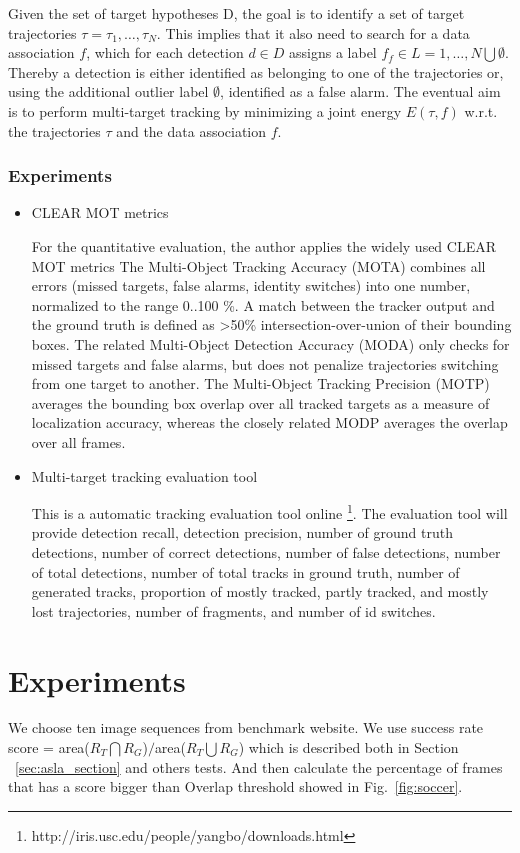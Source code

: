\documentclass{acm_proc_article-sp}
\begin{document}
Given the set of target hypotheses D, the goal is to identify a set of target trajectories $\tau = {\tau_1,\ldots,\tau_N}$. This implies that it also need to search for a data association $f$, which for each detection $d \in D$ assigns a label $f_f \in L = {1,\ldots,N}\bigcup \emptyset$. Thereby a detection is either identified as belonging to one of the trajectories or, using the additional outlier label $\emptyset$, identified as a false alarm.
The eventual aim is to perform multi-target tracking by minimizing a joint energy $E(\tau , f)$ w.r.t. the trajectories $\tau$ and the data association $f$. 

\subsubsection{Experiments}

\begin{itemize}
\item CLEAR MOT metrics

For the quantitative evaluation, the author applies the widely used CLEAR MOT metrics The Multi-Object Tracking Accuracy (MOTA) combines all errors (missed targets, false alarms, identity switches) into one number, normalized to the range 0..100 \%. A match between the tracker output and the ground truth is defined as >50\% intersection-over-union of their bounding boxes. The related Multi-Object Detection Accuracy (MODA) only checks for missed targets and false alarms, but does not penalize trajectories switching from one target to another. The Multi-Object Tracking Precision (MOTP) averages the bounding box overlap over all tracked targets as a measure of localization accuracy, whereas the closely related MODP averages the overlap over all frames.

\item Multi-target tracking evaluation tool

This is a automatic tracking evaluation tool online \footnote{http://iris.usc.edu/people/yangbo/downloads.html}. The evaluation tool will provide detection recall, detection precision, number of ground truth detections, number of correct detections, number of false detections, number of total detections, number of total tracks in ground truth, number of generated tracks, proportion of mostly tracked, partly tracked, and mostly lost trajectories, number of fragments, and number of id switches.
\end{itemize}


\section{Experiments}
We choose ten image sequences from benchmark website\cite{dataset}. We use success rate score = area($R_T \bigcap R_G$)$/$area($R_T \bigcup R_G$) which is described both in Section ~\ref{sec:asla_section} and others tests\cite{benchmark}. And then calculate the percentage of frames that has a score bigger than Overlap threshold showed in Fig.~\ref{fig:soccer}.
\end{document}

